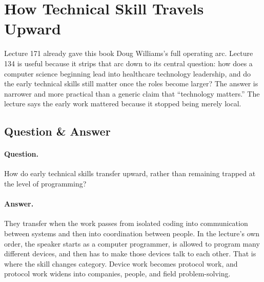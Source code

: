 \documentclass[11pt,oneside]{book}
\begin{document}

\section{How Technical Skill Travels Upward}

Lecture 171 already gave this book Doug Williams's full operating arc. Lecture 134 is useful because it strips that arc down to its central question: how does a computer science beginning lead into healthcare technology leadership, and do the early technical skills still matter once the roles become larger? The answer is narrower and more practical than a generic claim that ``technology matters.'' The lecture says the early work mattered because it stopped being merely local.

\subsection{Question \& Answer}

\paragraph{Question.}
How do early technical skills transfer upward, rather than remaining trapped at the level of programming?

\paragraph{Answer.}
They transfer when the work passes from isolated coding into communication between systems and then into coordination between people. In the lecture's own order, the speaker starts as a computer programmer, is allowed to program many different devices, and then has to make those devices talk to each other. That is where the skill changes category. Device work becomes protocol work, and protocol work widens into companies, people, and field problem-solving.
\end{document}
